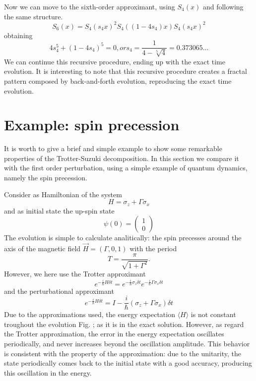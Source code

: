 Now we can move to the sixth-order approximant, using $S_4(x)$ and following the same structure.
\begin{equation}
S_6(x) = S_4(s_4x)^2 S_4((1-4s_4)x) S_4(s_4x)^2
\end{equation}
obtaining
\begin{equation}
4s_4^5 + (1-4s_4)^5 = 0, or s_4 = \frac{1}{4-\sqrt[5]{4}} = 0.373065\ldots
\end{equation}
We can continue this recursive procedure, ending up with the exact time evolution. It is interesting to note that this recursive procedure creates a fractal pattern composed by back-and-forth evolution, reproducing the exact time evolution.

\section{Example: spin precession}

It is worth to give a brief and simple example to show some remarkable properties of the Trotter-Suzuki decomposition. In this section we compare it with the first order perturbation, using a simple example of quantum dynamics, namely the spin precession.

Consider as Hamiltonian of the system
\begin{equation}
H = \sigma_z + \Gamma \sigma_x
\end{equation}
and as initial state the up-spin state
\begin{equation}
\psi(0) = 
\begin{pmatrix}
1 \\ 0
\end{pmatrix}
\end{equation}
The evolution is simple to calculate analitically: the spin precesses around the axis of the magnetic field $\vec{H} = (\Gamma, 0, 1)$ with the period
\begin{equation}
T = \frac{\pi}{\sqrt{1+\Gamma^2}}.
\end{equation}
However, we here use the Trotter approximant
\begin{equation}
e^{-\frac{i}{\hbar}H \delta t} = e^{-\frac{i}{\hbar} \sigma_z \delta t} e^{-\frac{i}{\hbar} \Gamma \sigma_x \delta t}
\end{equation}
and the perturbational approximant
\begin{equation}
e^{-\frac{i}{\hbar}H \delta t} = I - \frac{i}{\hbar}(\sigma_z + \Gamma\sigma_x) \delta t
\end{equation}
Due to the approximations used, the energy expectation $\langle H \rangle$ is not constant troughout the evolution Fig. ; as it is in the exact solution. However, as regard the Trotter approximation, the error in the energy expectation oscillates periodically, and never increases beyond the oscillation amplitude. This behavior is consistent with the property of the approximation: due to the unitarity, the state periodically comes back to the initial state with a good accuracy, producing this oscillation in the energy.

